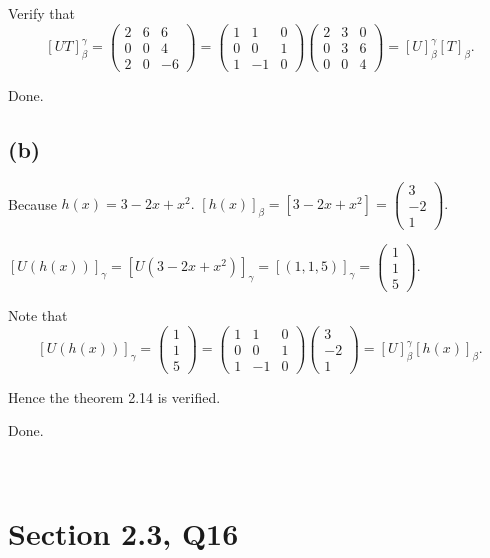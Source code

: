 \documentclass[12pt]{article}%
\begin{document}
Verify that $$[UT]_\beta^{\gamma}=\begin{pmatrix}2&6&6\\0&0&4\\2&0&-6\end{pmatrix}=\begin{pmatrix}1&1&0\\0&0&1\\1&-1&0\end{pmatrix}\begin{pmatrix}2&3&0\\0&3&6\\0&0&4\end{pmatrix}=[U]_\beta^{\gamma}[T]_\beta.$$

Done.

\subsection{(b)}

Because $h(x)=3-2x+x^2.$ $[h(x)]_\beta=[3-2x+x^2]=\begin{pmatrix}3\\-2\\1\end{pmatrix}.$

$[U(h(x))]_\gamma=[U(3-2x+x^2)]_\gamma=[(1,1,5)]_\gamma=\begin{pmatrix}1\\1\\5\end{pmatrix}.$

Note that $$[U(h(x))]_\gamma=\begin{pmatrix}1\\1\\5\end{pmatrix}=\begin{pmatrix}1&1&0\\0&0&1\\1&-1&0\end{pmatrix}\begin{pmatrix}3\\-2\\1\end{pmatrix}=[U]_\beta^{\gamma}[h(x)]_\beta.$$

Hence the theorem 2.14 is verified.

Done.

~\ 

\section{Section 2.3, Q16}
\end{document}

